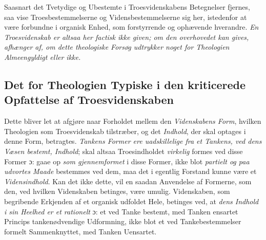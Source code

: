 \documentclass[12pt,a4paper]{book}
\begin{document}
Saasnart det Tvetydige og Ubestemte i Troesvidenskabens Betegnelser fjernes, saa vise
Troesbestemmelserne og Vidensbestemmelserne sig her, istedenfor at være forbundne i
organisk Enhed, som forstyrrende og ophævende hverandre. \emph{En Troesvidenskab er altsaa
her factisk ikke given; om den overhovedet kan gives, afhænger af, om dette theologiske
Forsøg udtrykker noget for Theologien Almeengyldigt eller ikke.}

\subsection{Det for Theologien Typiske i den kriticerede Opfattelse
  af Troesvidenskaben}
\label{ssec:typiske-troesvidenskab}

Dette bliver let at afgjøre naar Forholdet mellem den \emph{Videnskabens Form}, hvilken
Theologien som Troesvidenskab tilstræber, og det \emph{Indhold}, der skal optages i denne Form,
betragtes. \emph{Tankens Former ere uadskillelige fra et Tankens, ved dens Væsen bestemt,
Indhold}; skal altsaa Troesindholdet \emph{virkelig} formes ved disse Former ɔ: gaae op \emph{som gjennemformet} i disse Former, ikke blot \emph{partielt og paa udvortes Maade} bestemmes ved dem,
maa det i egentlig Forstand kunne være et \emph{Vidensindhold}. Kan det ikke dette, vil en
saadan Anvendelse af Formerne, som den, ved hvilken Videnskaben betinges, være umulig.
Videnskaben, som begribende Erkjenden af et organisk udfoldet Hele, betinges ved, at
\emph{dens Indhold i sin Heelhed er et rationelt} ɔ: et ved Tanke bestemt, med Tanken ensartet Princips tankenødvendige Udformning, ikke blot et ved Tankebestemmelser formelt Sammenknyttet, med Tanken Uensartet.
\end{document}
